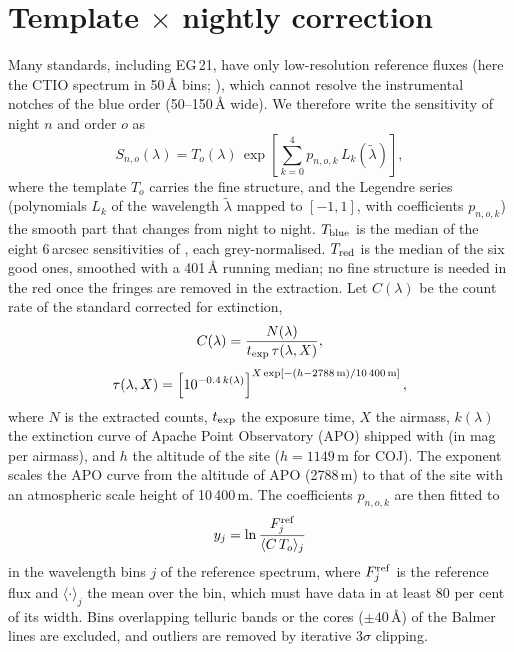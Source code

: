\section{Template $\times$ nightly correction}
\label{sec:flux_model}
Many standards, including EG\,21, have only low-resolution reference fluxes (here the CTIO spectrum in 50\,\AA{} bins;
\citealt{Hamuy1992,Hamuy1994}), which cannot resolve the instrumental notches of the blue order (50--150\,\AA{} wide).
We therefore write the sensitivity of night $n$ and order $o$ as
\begin{equation}
S_{n,o}(\lambda)=T_o(\lambda)\,\exp\left[\sum_{k=0}^{4}p_{n,o,k}\,L_k(\tilde\lambda)\right],
\label{eq:sens}
\end{equation}
where the template $T_o$ carries the fine structure, and the Legendre series (polynomials $L_k$ of the wavelength
$\tilde\lambda$ mapped to $[-1,1]$, with coefficients $p_{n,o,k}$) the smooth part that changes from night to night.
$T_{\rm blue}$ is the median of the eight 6\,arcsec sensitivities of \banzai{}, each grey-normalised. $T_{\rm red}$ is
the median of the six good ones, smoothed with a 401\,\AA{} running median; no fine structure is needed in the red once
the fringes are removed in the extraction. Let $C(\lambda)$ be the count rate of the standard corrected for
extinction,
\begin{equation}
C(\lambda)=\frac{N(\lambda)}{t_{\rm exp}\,\tau(\lambda,X)},
\label{eq:rate}
\end{equation}
\begin{equation}
\tau(\lambda,X)=\left[10^{-0.4\,k(\lambda)}\right]^{X\exp[-(h-2788\,{\rm m})/10\,400\,{\rm m}]},
\label{eq:ext}
\end{equation}
where $N$ is the extracted counts, $t_{\rm exp}$ the exposure time, $X$ the airmass, $k(\lambda)$ the extinction curve
of Apache Point Observatory (APO) shipped with \banzai{} (in mag per airmass), and $h$ the altitude of the site
($h=1149$\,m for COJ). The exponent scales the APO curve from the altitude of APO (2788\,m) to that of the site with an
atmospheric scale height of 10\,400\,m. The coefficients $p_{n,o,k}$ are then fitted to
\begin{equation}
y_j=\ln\frac{F^{\rm ref}_j}{\langle C\,T_o\rangle_j}
\label{eq:sensfit}
\end{equation}
in the wavelength bins $j$ of the reference spectrum, where $F^{\rm ref}_j$ is the reference flux and
$\langle\cdot\rangle_j$ the mean over the bin, which must have data in at least 80 per cent of its width. Bins
overlapping telluric bands or the cores ($\pm40$\,\AA) of the Balmer lines are excluded, and outliers are removed by
iterative $3\sigma$ clipping.


